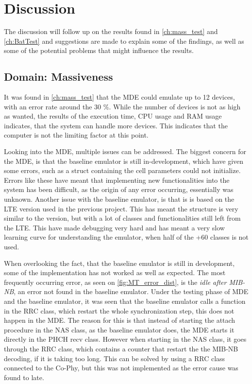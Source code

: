 \chapter{Discussion}
\label{ch:dics}
The discussion will follow up on the results found in \autoref{ch:mass_test} and \autoref{ch:BatTest} and suggestions are made to explain some of the findings, as well as some of the potential problems that might influence the results. 

\section{Domain: Massiveness}
It was found in \autoref{ch:mass_test} that the MDE could emulate up to 12 devices, with an error rate around the 30 $\%$. While the number of devices is not as high as wanted, the results of the execution time, CPU usage and RAM usage indicates, that the system can handle more devices. This indicates that the computer is not the limiting factor at this point. 

Looking into the MDE, multiple issues can be addressed. The biggest concern for the MDE, is that the baseline emulator is still in-development, which have given some errors, such as a struct containing the cell parameters could not initialize. Errors like these have meant that implementing new functionalities into the system has been difficult, as the origin of any error occurring, essentially was unknown. Another issue with the baseline emulator, is that is is based on the LTE version used in the previous project. This has meant the structure is very similar to the version, but with a lot of classes and functionalities still left from the LTE. This have made debugging very hard and has meant a very slow learning curve for understanding the emulator, when half of the +60 classes is not used.

When overlooking the fact, that the baseline emulator is still in development, some of the implementation has not worked as well as expected. The most frequently occurring error, as seen on \autoref{fig:MT_error_dist}, is the \textit{idle after MIB-NB}, an error not found in the baseline emulator. Under the testing phase of MDE and the baseline emulator, it was seen that the baseline emulator calls a function in the RRC class, which restart the whole synchronization step, this does not happen in the MDE. The reason for this is that instead of starting the attach procedure in the NAS class, as the baseline emulator does, the MDE starts it directly in the PHCH recv class. However when starting in the NAS class, it goes through the RRC class, which contains a counter that restart the the MIB-NB decoding, if it is taking too long. This can be solved by using a RRC class connected to the Co-Phy, but this was not implemented as the error cause was found to late.

